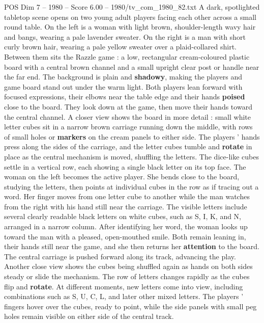\begin{textsample}{POS Dim 7 – 1980 – Score 6.00 – 1980/tv\_com\_1980\_82.txt}  \label{ex:f7_pos_045}
A dark, spotlighted tabletop scene opens on two young adult players facing each other across a small round table.
On the left is a woman with light brown, shoulder-length wavy hair and bangs, wearing a pale lavender sweater.
On the right is a man with short curly brown hair, wearing a pale yellow sweater over a plaid-collared shirt.
Between them sits the Razzle game : a low, rectangular cream-coloured plastic board with a central brown channel and a small upright clear post or handle near the far end.
The background is plain and \textbf{shadowy}, making the players and game board stand out under the warm light.
Both players lean forward with focused expressions, their elbows near the table edge and their hands \textbf{poised} close to the board.
They look down at the game, then move their hands toward the central channel.
A closer view shows the board in more detail : small white letter cubes sit in a narrow brown carriage running down the middle, with rows of small holes or \textbf{markers} on the cream panels to either side.
The players ’ hands press along the sides of the carriage, and the letter cubes tumble and \textbf{rotate} in place as the central mechanism is moved, shuffling the letters.
The dice-like cubes settle in a vertical row, each showing a single black letter on its top face.
The woman on the left becomes the active player.
She bends close to the board, studying the letters, then points at individual cubes in the row as if tracing out a word.
Her finger moves from one letter cube to another while the man watches from the right with his hand still near the carriage.
The visible letters include several clearly readable black letters on white cubes, such as S, I, K, and N, arranged in a narrow column.
After identifying her word, the woman looks up toward the man with a pleased, open-mouthed smile.
Both remain leaning in, their hands still near the game, and she then returns her \textbf{attention} to the board.
The central carriage is pushed forward along its track, advancing the play.
Another close view shows the cubes being shuffled again as hands on both sides steady or slide the mechanism.
The row of letters changes rapidly as the cubes flip and \textbf{rotate}.
At different moments, new letters come into view, including combinations such as S, U, C, L, and later other mixed letters.
The players ’ fingers hover over the cubes, ready to point, while the side panels with small peg holes remain visible on either side of the central track.

\end{textsample}
